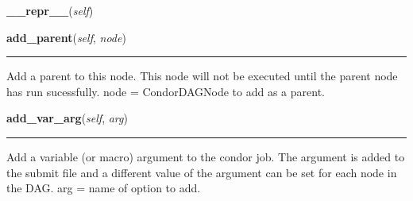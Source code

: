     \label{pipeline:CondorDAGNode:__repr__}
    \vspace{0.5ex}

    \noindent\begin{boxedminipage}{\textwidth}

    \raggedright \textbf{\_\_repr\_\_}(\textit{self})

    \end{boxedminipage}

    \label{pipeline:CondorDAGNode:add_parent}
    \vspace{0.5ex}

    \noindent\begin{boxedminipage}{\textwidth}

    \raggedright \textbf{add\_parent}(\textit{self}, \textit{node})

    \vspace{-1.5ex}

    \rule{\textwidth}{0.5\fboxrule}
    Add a parent to this node. This node will not be executed until the 
    parent node has run sucessfully. node = CondorDAGNode to add as a 
    parent.

    \vspace{1ex}

    \end{boxedminipage}

    \label{pipeline:CondorDAGNode:add_var_arg}
    \vspace{0.5ex}

    \noindent\begin{boxedminipage}{\textwidth}

    \raggedright \textbf{add\_var\_arg}(\textit{self}, \textit{arg})

    \vspace{-1.5ex}

    \rule{\textwidth}{0.5\fboxrule}
    Add a variable (or macro) argument to the condor job. The argument is 
    added to the submit file and a different value of the argument can be 
    set for each node in the DAG. arg = name of option to add.

    \vspace{1ex}

    \end{boxedminipage}

